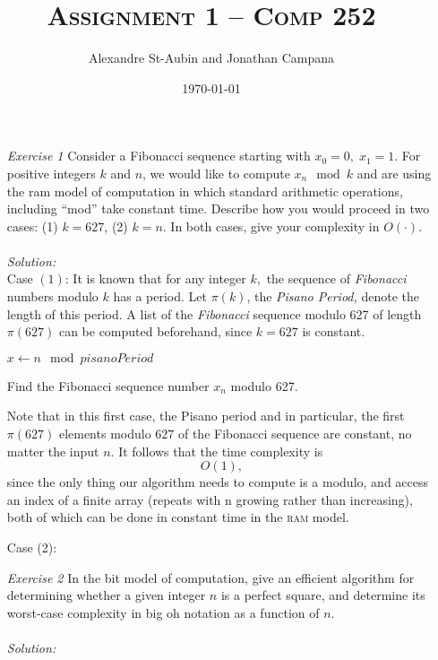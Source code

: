 \documentclass[12pt]{article}
\title{\textsc{Assignment 1 -- Comp 252}}
\author{Alexandre St-Aubin and Jonathan Campana}
\date{\today}
\theoremstyle{definition}
\theoremstyle{remark}
\newcommand\sol{%
  \\ 
  \\
  \textit{Solution:}\\%
}
\begin{document}
\maketitle 
\begin{enumerate}
  \item[\it Exercise 1] Consider a Fibonacci sequence starting with $x_0 = 0,\; x_1 = 1$. For positive integers $k$ and $n$, we would like to compute $x_n \mod k$ and are using the ram model of computation in which standard arithmetic operations, including “mod” take constant time. Describe how you would proceed in two cases: (1) $k = 627$, (2) $k = n$. In both cases, give your complexity in $O(\cdot)$.
  \sol  
  Case $(1)$: It is known that for any integer $k,$ the sequence of \textit{Fibonacci} numbers modulo $k$ has a period. Let $\pi (k)$, the \textit{Pisano Period, }denote the length of this period. A list of the \textit{Fibonacci} sequence modulo 627 of length $\pi (627)$ can be computed beforehand, since $k=627$ is constant. 

\IncMargin{1em}
\begin{algorithm}
\BlankLine
  {$x \leftarrow n \mod pisanoPeriod$}
\caption{Find the Fibonacci sequence number $x_n$ modulo 627. }\label{algo_disjdecomp}
\end{algorithm}\DecMargin{1em}
  Note that in this first case, the Pisano period and in particular, the first $\pi (627)$ elements modulo $627$ of the Fibonacci sequence are constant, no matter the input $n$. It follows that the time complexity is 
  $$O(1), $$
  since the only thing our algorithm needs to compute is a modulo, and access an index of a finite array (repeats with n growing rather than increasing), both of which can be done in constant time in the \textsc{ram} model.

  
  Case (2): 

\newpage
\item[\it Exercise 2] In the bit model of computation, give an efficient algorithm for determining whether a given integer $n$ is a perfect square, and determine its worst-case complexity in big oh notation as a function of $n$.
\sol  
\IncMargin{1em}
\begin{algorithm}


\end{algorithm}
\end{enumerate}
\end{document}
